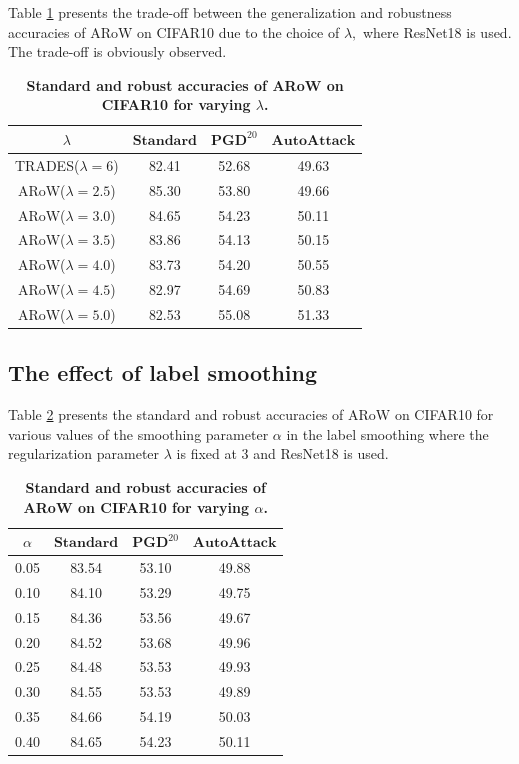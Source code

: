 \documentclass[nohyperref]{article}
\theoremstyle{plain}
\theoremstyle{definition}
\theoremstyle{remark}
\begin{document}
Table \ref{ablation_lambda} presents the trade-off between the generalization and robustness accuracies of ARoW on CIFAR10 due to the choice of $\lambda,$
where ResNet18 is used. The trade-off is obviously observed.
\begin{table}[H]
    \centering
    \caption{\textbf{Standard and robust accuracies of ARoW on CIFAR10 for varying $\lambda$.}}
    \begin{tabular}{c|ccc}
    \hline
    $\lambda$  & $\textbf{Standard}$ & $\textbf{PGD}^{20}$ & $\textbf{AutoAttack}$  \\
    \hline
    \hline
    TRADES($\lambda = 6$) & 82.41 & 52.68 & 49.63 \\
    \hline
    ARoW($\lambda = 2.5$) & 85.30 & 53.80 & 49.66 \\
    ARoW($\lambda = 3.0$) & 84.65 & 54.23 & 50.11 \\
    ARoW($\lambda = 3.5$) & 83.86 & 54.13 & 50.15 \\
    ARoW($\lambda = 4.0$) & 83.73 & 54.20 & 50.55 \\
    ARoW($\lambda = 4.5$) & 82.97 & 54.69 & 50.83 \\
    ARoW($\lambda = 5.0$) & 82.53 & 55.08 & 51.33 \\
    \hline
    \end{tabular}
    \label{ablation_lambda}
\end{table}

\subsection{The effect of label smoothing}
\label{ablation:ls}

Table \ref{ablation_alpha} presents the standard and robust accuracies
of ARoW on CIFAR10 for various values of the smoothing parameter $\alpha$ in the label smoothing where
the regularization parameter $\lambda$ is fixed at 3 and ResNet18 is used.

\begin{table}[H]
    \centering
    \caption{\textbf{Standard and robust accuracies of ARoW on CIFAR10 for varying $\alpha$.}}
    \begin{tabular}{c|ccc}
    \hline
    $\alpha$  & $\textbf{Standard}$ & $\textbf{PGD}^{20}$ & $\textbf{AutoAttack}$  \\
    \hline
    \hline
    0.05 & 83.54 & 53.10 & 49.88 \\
    0.10 & 84.10 & 53.29 & 49.75 \\
    0.15 & 84.36 & 53.56 & 49.67 \\
    0.20 & 84.52 & 53.68 & 49.96 \\
    0.25 & 84.48 & 53.53 & 49.93 \\
    0.30 & 84.55 & 53.53 & 49.89 \\
    0.35 & 84.66 & 54.19 & 50.03 \\
    0.40 & 84.65 & 54.23 & 50.11 \\
    \hline
    \end{tabular}
    \label{ablation_alpha}
\end{table}
\end{document}
